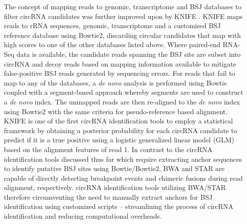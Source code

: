 \documentclass[journal,review,submit,pdftex,moreauthors]{Definitions/mdpi}
\begin{document}
The concept of mapping reads to genomic, transcriptome and BSJ databases to filter circRNA candidates was further improved upon by KNIFE \cite{KNIFE}. KNIFE maps reads to rRNA sequences, genomic, transcriptome and a customised BSJ reference database using Bowtie2, discarding circular candidates that map with high scores to one of the other databases listed above. Where paired-end RNA-Seq data is available, the candidate reads spanning the BSJ site are subset into circRNA and decoy reads based on mapping information available to mitigate false-positive BSJ reads generated by sequencing errors. For reads that fail to map to any of the databases, a \textit{de novo} analysis is performed using Bowtie coupled with a segment-based approach whereby segments are used to construct a \textit{de novo} index. The unmapped reads are then re-aligned to the \textit{de novo} index using Bowtie2 with the same criteria for pseudo-reference based alignment. KNIFE is one of the first circRNA identification tools to employ a statistical framework by obtaining a posterior probability for each circRNA candidate to predict if it is a true positive using a logistic generalized linear model (GLM) based on the alignment features of read 1. In contrast to the circRNA identification tools discussed thus far which require extracting anchor sequences to identify putative BSJ sites using Bowtie/Bowtie2, BWA and STAR are capable of directly detecting breakpoint events and chimeric fusions during read alignment, respectively. circRNA identification tools utilizing BWA/STAR therefore circumventing the need to manually extract anchors for BSJ identification using customized scripts -- streamlining the process of circRNA identification and reducing computational overheads. \par 
\end{document}
